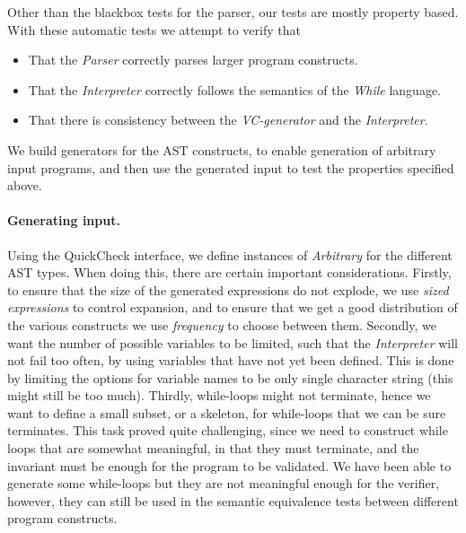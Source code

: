 Other than the blackbox tests for the parser, our tests are mostly property based.
With these automatic tests we attempt to verify that
\begin{itemize}
	\item That the \textit{Parser} correctly parses larger program constructs.
	\item That the \textit{Interpreter} correctly follows the semantics of the \textit{While} language.
	\item That there is consistency between the \textit{VC-generator} and the \textit{Interpreter}.
\end{itemize}
We build generators for the AST constructs, to enable generation of arbitrary input programs, and then use the generated input to test the properties specified above.

\paragraph{Generating input.}
Using the QuickCheck interface, we define instances of \textit{Arbitrary} for the different AST types.
When doing this, there are certain important considerations.
Firstly, to ensure that the size of the generated expressions do not explode, we use \textit{sized expressions} to control expansion, and to ensure that we get a good distribution of the various constructs we use \textit{frequency} to choose between them.
Secondly, we want the number of possible variables to be limited, such that the \textit{Interpreter} will not fail too often, by using variables that have not yet been defined. This is done by limiting the options for variable names to be only single character string (this might still be too much).
Thirdly, while-loops might not terminate, hence we want to define a small subset, or a skeleton, for while-loops that we can be sure terminates. This task proved quite challenging, since we need to construct while loops that are somewhat meaningful, in that they must terminate, and the invariant must be enough for the program to be validated. We have been able to generate some while-loops but they are not meaningful enough for the verifier, however, they can still be used in the semantic equivalence tests between different program constructs.

